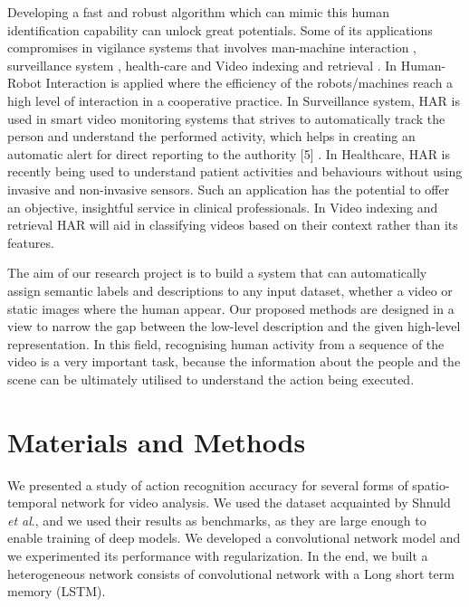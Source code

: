 \documentclass{vldb}
\begin{document}
 Developing a fast and robust algorithm which can mimic this human identification capability can unlock great potentials. Some of its applications compromises in vigilance systems that involves man-machine interaction\cite{aggarwal2011human} \cite{kraiss2006advanced} , surveillance system \cite{roshtkhari2013human}, health-care \cite{chaaraoui2014evolutionary} and Video indexing and retrieval \cite{ramezani2016review}. In Human-Robot Interaction is applied where the efficiency of the robots/machines reach a high level of interaction in a cooperative practice. In Surveillance system, HAR is used in smart video monitoring systems that strives to automatically track the person and understand the performed activity, which helps in creating an automatic alert for direct reporting to the authority [5]
. In Healthcare, HAR is recently being used to understand patient activities and behaviours without using invasive and non-invasive sensors. Such an application has the potential to offer an objective, insightful service in clinical professionals. In Video indexing and retrieval HAR will aid in classifying videos based on their context rather than its features.

The aim of our research project is to build a system that can automatically assign semantic labels and descriptions to any input dataset, whether a video or static images where the human appear. Our proposed methods are designed in a view to narrow the gap between the low-level description and the given high-level representation. In this field, recognising human activity from a sequence of the video is a very important task, because the information about the people and the scene can be ultimately utilised to understand the action being executed.



\section{Materials and Methods}
We presented a study of action recognition accuracy for several forms of spatio-temporal network for video analysis. We used the dataset acquainted by Shnuld \textit{et al}.\cite{laptev2004recognizing}, and we used their results as benchmarks, as they are large enough to enable training of deep models. We developed a convolutional network model and we experimented its performance with regularization. In the end, we built a heterogeneous network consists of convolutional network with a Long short term memory (LSTM). 
\end{document}

